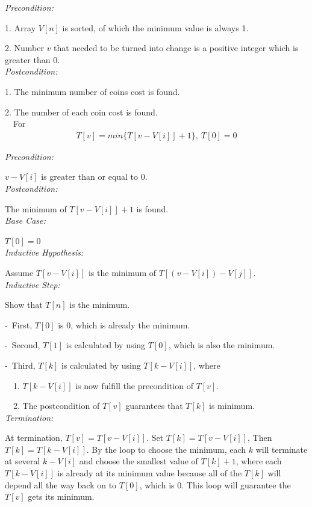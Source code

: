 \documentclass[11pt]{scrreprt}
\begin{document}
\emph{Precondition:}

1. Array $V[n]$ is sorted, of which the minimum value is always 1.
 
2. Number $v$ that needed to be turned into change is a positive integer which is greater than 0.\\

\emph{Postcondition:}

1. The minimum number of coins cost is found.

2. The number of each coin cost is found.\\

\ \ For
\begin{eqnarray*}
T[v] = min\{T[v - V[i]] + 1\},\ T[0] = 0
\end{eqnarray*}

\emph{Precondition:}

$v - V[i]$ is greater than or equal to 0.\\

\emph{Postcondition:}

The minimum of $T[v - V[i]] + 1$ is found.\\

\emph{Base Case:}

$T[0] = 0$\\

\emph{Inductive Hypothesis:}

Assume $T[v - V[i]]$ is the minimum of $T[(v - V[i]) - V[j]]$.\\

\emph{Inductive Step:}

Show that $T[n]$ is the minimum.

-\ First, $T[0]$ is 0, which is already the minimum.

-\ Second, $T[1]$ is calculated by using $T[0]$, which is also the minimum.

-\ Third, $T[k]$ is calculated by using $T[k - V[i]]$, where

\ \ 1. $T[k - V[i]]$ is now fulfill the precondition of $T[v]$.

\ \ 2. The postcondition of $T[v]$ guarantees that $T[k]$ is minimum.\\

\emph{Termination:}

At termination, $T[v] = T [v - V[i]]$. Set $T[k] = T[v - V[i]]$, Then $T[k] = T[k - V[i]]$. By the loop to choose the minimum, each $k$ will terminate at several $k - V[i]$ and choose the smallest value of $T[k] + 1$, where each $T[k - V[i]]$ is already at its minimum value because all of the $T[k]$ will depend all the way back on to $T[0]$, which is 0. This loop will guarantee the $T[v]$ gets its minimum.
\end{document}
